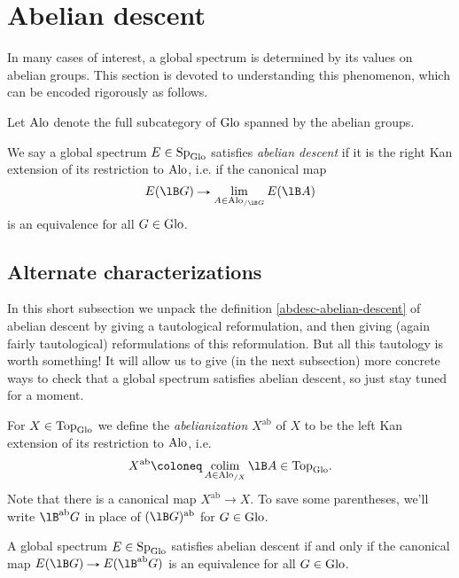 \section{Abelian descent}
\label{abdesc}

In many cases of interest, a global spectrum is determined by its
values on abelian groups. This section is devoted to understanding
this phenomenon, which can be encoded rigorously as follows.

\begin{notation}
  \label{abdesc-alo}
  Let $\mathrm{Alo}$ denote the full subcategory of $\mathrm{Glo}$ spanned by the
  abelian groups.
\end{notation}

\begin{definition}
  \label{abdesc-abelian-descent}
  We say a global spectrum $E \in \mathrm{Sp}_{\mathrm{Glo}}$ satisfies \emph{abelian
    descent} if it is the right Kan extension of its restriction to
  $\mathrm{Alo}$, i.e. if the canonical map
  \[
  E(\lB G) \to \lim_{A \in \Alo_{/\lB G}} E(\lB A)
  \]
  is an equivalence for all $G \in \mathrm{Glo}$.
\end{definition}

\subsection{Alternate characterizations}
\label{abdesc-alternate}

In this short subsection we unpack the definition
\cref{abdesc-abelian-descent} of abelian descent by giving a
tautological reformulation, and then giving (again fairly
tautological) reformulations of this reformulation. But all this
tautology is worth something! It will allow us to give (in the next
subsection) more concrete ways to check that a global spectrum
satisfies abelian descent, so just stay tuned for a moment.

\newcommand{\ab}{\mathrm{ab}}

\begin{definition}
  \label{abdesc-abelianization}
  For $X \in \mathrm{Top}_{\mathrm{Glo}}$ we define the \emph{abelianization} $X^\ab$ of
  $X$ to be the left Kan extension of its restriction to $\mathrm{Alo}$,
  i.e.
  \[
  X^\ab \ce \colim_{A \in \Alo_{/X}} \lB A \in \Top_\Glo.
  \]
  Note that there is a canonical map $X^\ab \to X$. To save some
  parentheses, we'll write $\lB^\ab G$ in place of $(\lB G)^\ab$ for
  $G \in \mathrm{Glo}$.
\end{definition}

\begin{lemma}
  \label{abdesc-abelian-descent-abelianization}
  A global spectrum $E \in \mathrm{Sp}_{\mathrm{Glo}}$ satisfies abelian descent if and
  only if the canonical map $E(\lB G) \to E(\lB^\ab G)$ is an
  equivalence for all $G \in \mathrm{Glo}$.
\end{lemma}

